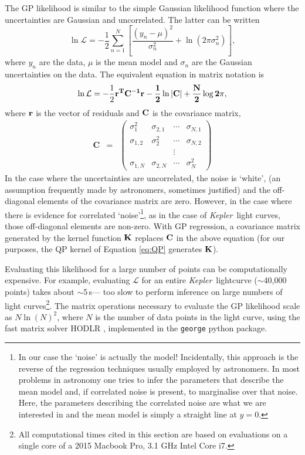 \documentclass[a4paper,fleqn,usenatbib,useAMS]{mnras}
\newcommand{\Kepler}{{\it Kepler}}
\begin{document}
The GP likelihood is similar to the simple Gaussian likelihood
function where the uncertainties are
Gaussian and uncorrelated. The latter can be written
\begin{equation}
    \ln \mathcal{L} = -\frac{1}{2}\sum_{n=1}^N\left[\frac{(y_n-\mu)^2}{\sigma_n^2}
    + \ln(2\pi\sigma_n^2)\right],
\end{equation}
\label{eq:chi2}
where $y_n$ are the data, $\mu$ is the mean model and $\sigma_n$ are the
Gaussian uncertainties on the data.
The equivalent equation in matrix notation is
\begin{equation}
    \ln \mathcal{L} = -\frac{1}{2}\bf{r}^T\bf{C}^{-1}\bf{r}-\frac{1}{2}\ln|\bf{C}|
    + \frac{N}{2}\log2\pi,
\end{equation}
\label{eq:lhf1}
where $\bf{r}$ is the vector of residuals and $\bf{C}$ is the covariance
matrix,
\begin{eqnarray}
    \mathbf{C} &=& \left (\begin{array}{cccc}
    \sigma^2_1 & \sigma_{2, 1} & \cdots & \sigma_{N, 1} \\
    \sigma_{1, 2} & \sigma^2_2 & \cdots & \sigma_{N, 2} \\
    && \vdots & \\
    \sigma_{1, N} & \sigma_{2, N} & \cdots & \sigma^2_N
\end{array}\right )
\end{eqnarray}
In the case where the uncertainties are uncorrelated, the noise is `white',
(an assumption frequently made by astronomers, sometimes justified)
and the off-diagonal elements of the covariance matrix are zero.
However, in the case where there is evidence for correlated
`noise'\footnote{In our case the `noise' is actually the model!  Incidentally, this approach is the reverse of the regression techniques
usually employed by astronomers.
In most problems in astronomy one tries to infer the parameters that describe
the mean model and, if correlated noise is present, to marginalise over that
noise.
Here, the parameters describing the correlated noise are what we are
interested in and the mean model is simply a straight line at $y=0$.}, as in the
case of \Kepler\ light curves, those off-diagonal elements are non-zero.
With GP regression, a covariance matrix generated by the kernel function
${\bf K}$ replaces ${\bf C}$ in the above equation (for our purposes, the QP
kernel of Equation \ref{eq:QP} generates ${\bf K}$).

Evaluating this likelihood for a large number of points can be computationally
expensive.
For example, evaluating $\mathcal L$ for an entire \Kepler\ lightcurve
($\sim$40,000 points) takes about $\sim$5\,s--- too slow to perform inference
on large numbers of light curves\footnote{All computational times cited in
this section are based on evaluations on a single core of a 2015 Macbook Pro,
3.1 GHz Intel Core i7.}.
The matrix operations necessary to evaluate the GP likelihood scale as
$N\ln(N)^2$, where $N$ is the number of data points in the light curve, using
the fast matrix solver HODLR \citep{Ambikasaran2014},
implemented in the {\tt george} \citep{George} python package.
\end{document}
